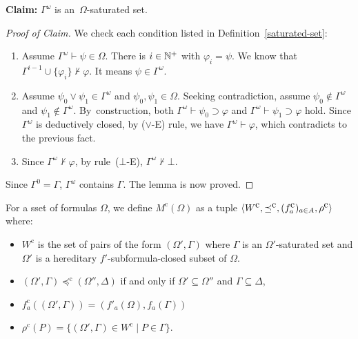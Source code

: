 \noindent \textbf{Claim:}
$\Gamma^\omega$ is an~$\Omega$-saturated set.
\begin{proof}[Proof of Claim]
We check each condition listed in
 Definition~\ref{saturated-set}:
\begin{enumerate}
 \item  Assume $\Gamma^\omega \vdash \psi\in\Omega$. There is $i\in{\mathbb N}^{+}$ with $\varphi_i = \psi$.
 We know that $\Gamma^{i-1}\cup\{\varphi_i\}\not\vdash\varphi$. It means
 $\psi\in\Gamma^\omega$.
 \item Assume $\psi_0\vee\psi_1\in\Gamma^\omega$ and $\psi_0,\psi_1\in\Omega$.
       Seeking contradiction, assume $\psi_0\notin\Gamma^\omega$ and
       $\psi_1\notin\Gamma^\omega$.
       By~construction, both $\Gamma^\omega\vdash \psi_0\supset \varphi$ and 
       $\Gamma^\omega\vdash\psi_1\supset \varphi$ hold.
       Since $\Gamma^\omega$ is deductively closed, by ($\vee$-E) rule, we have $\Gamma^\omega\vdash\varphi$,
       which contradicts to the previous fact.
 \item Since $\Gamma^\omega\not\vdash\varphi$, by rule~($\bot$-E), $\Gamma^\omega\not\vdash\bot$.
\end{enumerate}

\noindent Since $\Gamma^0 = \Gamma$\kern -2pt, $\Gamma^\omega$ contains $\Gamma$\kern -2pt. 
The lemma is now proved.
\end{proof}
 

\newcommand{\canon}[1]{#1^{\mbox{c}}}
\begin{definition}
\label{cancan}
 For a sset of formulas $\Omega$,
 we define $\canon M(\Omega)$ as a tuple $\langle{W^{\mbox{c}}, \preceq^{\mbox{c}}, (f_a^{\mbox{c}})_{a\in A}, \rho^{\mbox{c}}}\rangle$ where:
\begin{itemize}
 \item $\canon W$ is the set of pairs of the form $(\Omega', \Gamma)$ where
       $\Gamma$ is an $\Omega'$-saturated set and
       $\Omega'$ is a hereditary $f'$-subformula-closed subset of $\Omega$.
 \item $(\Omega', \Gamma)\canon\preceq(\Omega'',\Delta)$ if and only if
       $\Omega'\subseteq \Omega''$ and $\Gamma\subseteq\Delta$,
 \item $\canon f_a((\Omega',\Gamma)) = (f'_a(\Omega), f_a(\Gamma))$
 \item $\canon \rho(P) = \{(\Omega',\Gamma)\in \canon W\mid P\in\Gamma\}$.
\end{itemize}
\end{definition}

